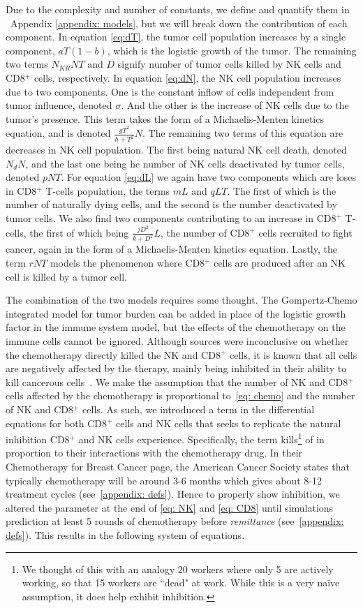 \documentclass[11pt]{amsart}
\begin{document}
Due to the complexity and number of constants, we define and quantify them in \ Appendix \ref{appendix: models}, but we will break down the contribution of each component. 
In equation \eqref{eq:dT}, the tumor cell population increases by a single component, $aT(1-b)$, which is the logistic growth  of the tumor. The remaining two terms $N_{KR}NT$ and $D$ signify number of  tumor cells killed by NK cells and CD8$^+$ cells, respectively.
In equation \eqref{eq:dN}, the NK cell population increases due to two components. One is the constant inflow of cells independent from tumor influence, denoted $\sigma$. And the other is the increase of NK cells due to the tumor's presence. This term takes the form of a Michaelis-Menten kinetics equation, and is denoted $\frac{gT^2}{h + T^2}N$. The remaining two terms of this equation are decreases in NK cell population. The first being natural NK cell death, denoted $N_dN$, and the last one being he number of NK cells deactivated by tumor cells, denoted $pNT$.
For equation \eqref{eq:dL} we again have two components which are loses in CD8$^+$ T-cells population, the terms $mL$ and $qLT$. The first of which is the number of naturally dying cells, and the second is the number deactivated by tumor cells. We also find two components contributing to an increase in CD8$^+$ T-cells, the first of which being $\frac{jD^2}{k + D^2}L$, the number of CD8$^+$ cells recruited to fight cancer, again in the form of a Michaelis-Menten kinetics equation. Lastly, the term $rNT$ models the phenomenon where CD8$^+$ cells are produced after an NK cell is killed by a tumor cell. 


The combination of the two models requires some thought.
The Gompertz-Chemo integrated model for tumor burden can be added in place of the logistic growth factor in the immune system model, but the effects of the chemotherapy on the immune cells cannot be ignored.
Although sources were inconclusive on whether the chemotherapy directly killed the NK and CD8$^+$ cells, it is known that all cells are negatively affected by the therapy, mainly being inhibited in their ability to kill cancerous cells\ \cite{RebeCytoChemonImmune}.
We make the assumption that the number of NK and CD8$^+$ cells affected by the chemotherapy is proportional to\ \eqref{eq: chemo} and the number of NK and CD8$^+$ cells. 
As such, we introduced a term in the differential equations for both CD8$^+$ cells and NK cells that seeks to replicate the natural inhibition CD8$^+$ and NK cells experience.
Specifically, the term kills\footnote{We thought of this with an analogy 20 workers where only 5 are actively working, so that 15 workers are ``dead" at work. While this is a very naïve assumption, it does help exhibit inhibition.} of in proportion to their interactions with the chemotherapy drug.
In their Chemotherapy for Breast Cancer page, the American Cancer Society states that typically chemotherapy will be around 3-6 months which gives about 8-12 treatment cycles (see\ \ref{appendix: defs}).
Hence to properly show inhibition, we altered the parameter at the end of \eqref{eq: NK} and \eqref{eq: CD8} until simulations prediction at least 5 rounds of chemotherapy before \textit{remittance} (see\ \ref{appendix: defs}).
This results in the following system of equations.
\end{document}
